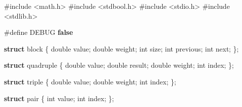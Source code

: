 \documentclass[
  12pt,
  letterpaper,
  DIV=11,
  numbers=noendperiod]{scrreprt}
\newenvironment{Shaded}{\begin{snugshade}}{\end{snugshade}}
\newcommand{\DataTypeTok}[1]{\textcolor[rgb]{0.68,0.00,0.00}{#1}}
\newcommand{\ImportTok}[1]{\textcolor[rgb]{0.00,0.46,0.62}{#1}}
\newcommand{\KeywordTok}[1]{\textcolor[rgb]{0.00,0.23,0.31}{\textbf{#1}}}
\newcommand{\NormalTok}[1]{\textcolor[rgb]{0.00,0.23,0.31}{#1}}
\newcommand{\OperatorTok}[1]{\textcolor[rgb]{0.37,0.37,0.37}{#1}}
\newcommand{\PreprocessorTok}[1]{\textcolor[rgb]{0.68,0.00,0.00}{#1}}
\theoremstyle{remark}
\begin{document}
\begin{Shaded}
\begin{Highlighting}[]

\PreprocessorTok{\#include }\ImportTok{\textless{}math.h\textgreater{}}
\PreprocessorTok{\#include }\ImportTok{\textless{}stdbool.h\textgreater{}}
\PreprocessorTok{\#include }\ImportTok{\textless{}stdio.h\textgreater{}}
\PreprocessorTok{\#include }\ImportTok{\textless{}stdlib.h\textgreater{}}

\PreprocessorTok{\#define DEBUG }\KeywordTok{false}

\KeywordTok{struct}\NormalTok{ block }\OperatorTok{\{}
    \DataTypeTok{double}\NormalTok{ value}\OperatorTok{;}
    \DataTypeTok{double}\NormalTok{ weight}\OperatorTok{;}
    \DataTypeTok{int}\NormalTok{ size}\OperatorTok{;}
    \DataTypeTok{int}\NormalTok{ previous}\OperatorTok{;}
    \DataTypeTok{int}\NormalTok{ next}\OperatorTok{;}
\OperatorTok{\};}

\KeywordTok{struct}\NormalTok{ quadruple }\OperatorTok{\{}
    \DataTypeTok{double}\NormalTok{ value}\OperatorTok{;}
    \DataTypeTok{double}\NormalTok{ result}\OperatorTok{;}
    \DataTypeTok{double}\NormalTok{ weight}\OperatorTok{;}
    \DataTypeTok{int}\NormalTok{ index}\OperatorTok{;}
\OperatorTok{\};}

\KeywordTok{struct}\NormalTok{ triple }\OperatorTok{\{}
    \DataTypeTok{double}\NormalTok{ value}\OperatorTok{;}
    \DataTypeTok{double}\NormalTok{ weight}\OperatorTok{;}
    \DataTypeTok{int}\NormalTok{ index}\OperatorTok{;}
\OperatorTok{\};}

\KeywordTok{struct}\NormalTok{ pair }\OperatorTok{\{}
    \DataTypeTok{int}\NormalTok{ value}\OperatorTok{;}
    \DataTypeTok{int}\NormalTok{ index}\OperatorTok{;}
\OperatorTok{\};}


\end{Highlighting}
\end{Shaded}
\end{document}
